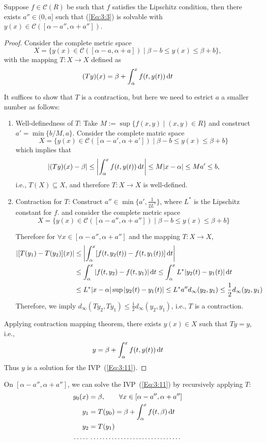 \begin{theorem}\label{The:3:4}
Suppose $f\in\mathcal{C}(R)$ be such that $f$ satisfies the Lipschitz condition, then there exists $a''\in(0,a]$ such that (\ref{Eq:3:3}) is solvable with $y(x)\in\mathcal{C}([\alpha-a'',\alpha+a''])$. 
\end{theorem}

\begin{proof}
Consider the complete metric space
\[
X=\{y(x)\in \mathcal{C}([\alpha-a,\alpha+a])
\mid\beta-b\le y(x)\le\beta+b
\},
\]
with the mapping $T:X\to X$ defined as
\[
(Ty)(x)=\beta
+
\int_\alpha^xf(t,y(t))\,\mathrm{d} t
\]

It suffices to show that $T$ is a contraction, but here we need to estrict $a$ a smaller number as follows:
\begin{enumerate}
\item
Well-definedness of $T$: Take $M:=\sup\{f(x,y)\mid (x,y)\in R\}$ and construct $a'=\min\{b/M,a\}$. Consider the complete matric space 
\[
X=\{y(x)\in \mathcal{C}([\alpha-a',\alpha+a'])
\mid\beta-b\le y(x)\le\beta+b
\}
\]
which implies that 
\[
|(Ty)(x)-\beta|\le 
\left|\int_\alpha^xf(t,y(t))\,\mathrm{d} t\right|
\le M|x-\alpha|\le Ma'\le b,
\]
i.e., $T(X)\subseteq X$, and therefore $T:X\to X$ is well-defined.
\item
Contraction for $T$: Construct $a''\in\min\{a',\frac{1}{2L^*}\}$, where $L^*$ is the Lipschitz constant for $f$. and consider the complete metric space
\[
X=\{y(x)\in \mathcal{C}([\alpha-a'',\alpha+a''])
\mid\beta-b\le y(x)\le\beta+b
\}
\]

Therefore for $\forall x\in[\alpha-a'',\alpha+a'']$ and the mapping $T:X\to X$,
\begin{align*}
|[T(y_1)-T(y_2)](x)|&\le
\left|
\int_\alpha^x[f(t,y_2(t))-f(t,y_1(t))]\,\mathrm{d} t
\right|\\
&\le\int_\alpha^x|f(t,y_2)-f(t,y_1)|\,\mathrm{d} t\le\int_\alpha^xL^*|y_2(t)-y_1(t)|\,\mathrm{d} t\\
&\le L^*|x-\alpha|\sup|y_2(t)-y_1(t)|\le L^*a''d_\infty(y_2,y_1)
\le\frac{1}{2}d_\infty(y_2,y_1)
\end{align*}
Therefore, we imply $d_\infty(Ty_2,Ty_1)\le\frac{1}{2}d_\infty(y_2,y_1)$, i.e., $T$ is a contraction.
\end{enumerate}
Applying contraction mapping theorem, there exists $y(x)\in X$ such that $Ty=y$, i.e.,
\[
y=\beta+\int_\alpha^xf(t,y(t))\,\mathrm{d} t
\]
Thus $y$ is a solution for the IVP~(\ref{Eq:3:11}).
\end{proof}
\begin{remark}
On $[\alpha-a'',\alpha+a'']$, we can solve the IVP~(\ref{Eq:3:11}) by recursively applying $T$:
\begin{align*}
y_0(x)&=\beta,\qquad
\forall x\in[\alpha-a'',\alpha+a'']\\
y_1&=T(y_0)=\beta+\int_\alpha^xf(t,\beta)\diff t\\
y_2&=T(y_1)\\
\multispan1\dotfill&\multispan1\dotfill\\
\end{align*}
\end{remark}

